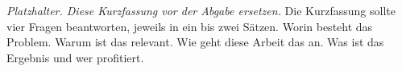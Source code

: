 
\textit{Platzhalter. Diese Kurzfassung vor der Abgabe ersetzen.}
Die Kurzfassung sollte vier Fragen beantworten, jeweils in ein bis zwei Sätzen.
Worin besteht das Problem.
Warum ist das relevant.
Wie geht diese Arbeit das an.
Was ist das Ergebnis und wer profitiert.

\emptySecPageOld
